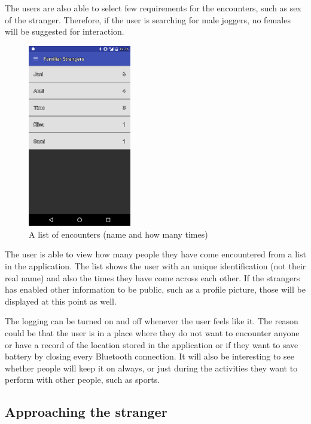 The users are also able to select few requirements for the encounters, such as sex of the stranger. Therefore, if the user is searching for male joggers, no females will be suggested for interaction.

\begin{figure}[htb]
	\begin{center}
		\includegraphics[width=0.4\textwidth]{encounters.png}
		\caption{A list of encounters (name and how many times)}	
	\end{center}
\end{figure}

The user is able to view how many people they have come encountered from a list in the application. The list shows the user with an unique identification (not their real name) and also the times they have come across each other. If the strangers has enabled other information to be public, such as a profile picture, those will be displayed at this point as well.

The logging can be turned on and off whenever the user feels like it. The reason could be that the user is in a place where they do not want to encounter anyone or have a record of the location stored in the application or if they want to save battery by closing every Bluetooth connection. It will also be interesting to see whether people will keep it on always, or just during the activities they want to perform with other people, such as sports.

\subsection{Approaching the stranger}


